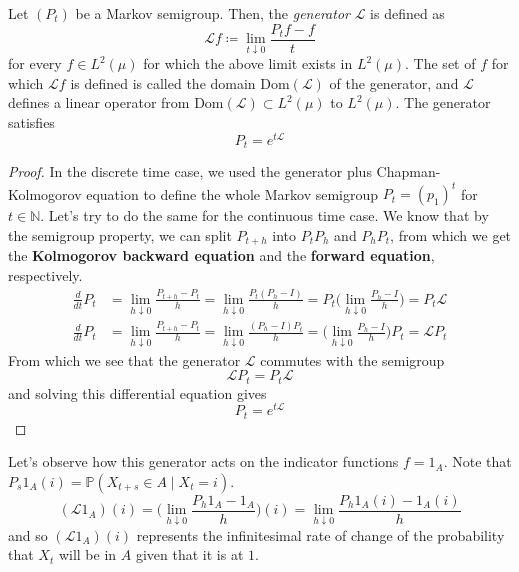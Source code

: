 	\begin{definition}[Generator]
		\label{def:generator}
		Let $(P_t)$ be a Markov semigroup. Then, the \textit{generator} $\mathscr{L}$ is defined as 
		\begin{equation}
			\mathscr{L} f \coloneqq \lim_{t \downarrow 0} \frac{P_t f - f}{t}
		\end{equation}
		for every $f \in L^2 (\mu)$ for which the above limit exists in $L^2 (\mu)$. The set of $f$ for which $\mathscr{L}f$ is defined is called the domain $\mathrm{Dom}(\mathscr{L})$ of the generator, and $\mathscr{L}$ defines a linear operator from $\mathrm{Dom}(\mathscr{L}) \subset L^2 (\mu)$ to $L^2 (\mu)$. The generator satisfies 
		\begin{equation}
		  P_t = e^{t \mathcal{L}}
		\end{equation}
	\end{definition}
	\begin{proof}
		In the discrete time case, we used the generator plus Chapman-Kolmogorov equation to define the whole Markov semigroup $P_t = (p_1)^t$ for $t \in \mathbb{N}$. Let's try to do the same for the continuous time case. We know that by the semigroup property, we can split $P_{t + h}$ into $P_t P_h$ and $P_h P_t$, from which we get the \textbf{Kolmogorov backward equation} and the \textbf{forward equation}, respectively. 
		\begin{align*}
			\frac{d}{dt} P_t & = \lim_{h \downarrow 0} \frac{P_{t + h} - P_t}{h} = \lim_{h \downarrow 0} \frac{P_t ( P_h - I)}{h} = P_t \bigg( \lim_{h \downarrow 0} \frac{P_h - I}{h} \bigg) = P_t \mathscr{L} \\
			\frac{d}{dt} P_t & = \lim_{h \downarrow 0} \frac{P_{t + h} - P_t}{h} = \lim_{h \downarrow 0} \frac{( P_h - I) P_t}{h} = \bigg( \lim_{h \downarrow 0} \frac{P_h - I}{h} \bigg) P_t = \mathscr{L} P_t
		\end{align*}
		From which we see that the generator $\mathscr{L}$ commutes with the semigroup 
		\begin{equation}
			\mathscr{L} P_t = P_t \mathscr{L}
		\end{equation}
		and solving this differential equation gives 
		\begin{equation}
			P_t = e^{t \mathscr{L}}
		\end{equation}
	\end{proof}

	Let's observe how this generator acts on the indicator functions $f = 1_A$. Note that $P_s 1_A (i) = \mathbb{P}(X_{t + s} \in A \mid X_t = i)$. 
	\begin{equation}
		(\mathscr{L} 1_A) (i) = \bigg( \lim_{h \downarrow 0} \frac{P_h 1_A - 1_A}{h} \bigg) (i) = \lim_{h \downarrow 0} \frac{ P_h 1_A (i) - 1_A (i)}{h}
	\end{equation}
	and so $(\mathscr{L} 1_A)(i)$ represents the infinitesimal rate of change of the probability that $X_t$ will be in $A$ given that it is at $1$. 


